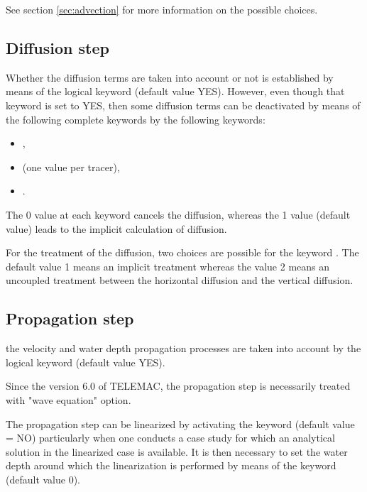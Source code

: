 See section \ref{sec:advection} for more information on the possible choices.

\subsection{Diffusion step}

Whether the diffusion terms are taken into account or not is established by
means of the logical keyword  (default value YES).
However, even though that keyword is set to YES, then some diffusion terms can
be deactivated by means of the following complete keywords by the following
keywords:

\begin{itemize}
\item {},

\item {} (one value per tracer),

\item {}.
\end{itemize}

The 0 value at each keyword cancels the diffusion, whereas the 1 value
(default value) leads to the implicit calculation of diffusion.

For the treatment of the diffusion, two choices are possible for the keyword
. The default value 1 means an implicit
treatment whereas the value 2 means an uncoupled treatment between the
horizontal diffusion and the vertical diffusion.


\subsection{Propagation step}

the velocity and water depth propagation processes are taken into account by
the logical keyword  (default value YES).

Since the version 6.0 of TELEMAC, the propagation step is necessarily treated
with  "wave equation" option.

The propagation step can be linearized by activating the keyword
 (default value = NO) particularly when one
conducts a case study for which an analytical solution in the linearized case
is available. It is then necessary to set the water depth around which the
linearization is performed by means of the keyword  (default value 0).

